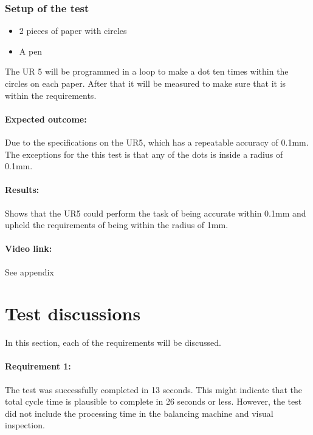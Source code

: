 \subsubsection{Setup of the test}

\begin{itemize}
 \item 2 pieces of paper with circles 
 \item A pen 
\end{itemize}

The UR 5 will be programmed in a loop to make a dot ten times within the circles on each paper. After that it will be measured to make sure that it is within the requirements.

\paragraph{Expected outcome:}
Due to the specifications on the UR5, which has a repeatable accuracy of 0.1mm. The exceptions for the this test is that any of the dots is inside a radius of 0.1mm.

\paragraph{Results: }
Shows that the UR5 could perform the task of being accurate within 0.1mm and upheld the requirements of being within the radius of 1mm. 

\paragraph{Video link: }
See appendix \cite{testfilm}



\section{Test discussions}
In this section, each of the requirements will be discussed. 

\paragraph{Requirement 1:}
The test was successfully completed in 13 seconds. This might indicate that the total cycle time is plausible to complete in 26 seconds or less. However, the test did not include the processing time in the balancing machine and visual inspection. 

